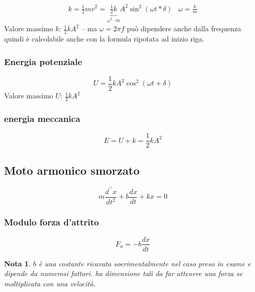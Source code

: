 \documentclass{book}
\newtheorem{nota}{Nota}[section]
\begin{document}
\begin{equation}
  \label{eq:encin}
  \begin{matrix}
    k=\frac{1}{2}mv^2=\underbrace{\frac{1}{2}k}_{\omega^2\cdot m}A^2\sin^2(\omega t*\delta) & \omega=\frac{k}{m}
  \end{matrix}
\end{equation}
Valore massimo $k$: $\frac{1}{2}kA^2$ -- ma $\omega=2\pi f$ può dipendere anche dalla frequenza quindi è calcolabile anche con la formula ripotata ad inizio riga.
\begin{multicols}{2}
  \subsubsection{Energia potenziale}
  \label{sec:enpotmotoarm}
  \begin{equation*}
    U=\frac{1}{2}kA^2\cos^2(\omega t +\delta)
  \end{equation*}
  Valore massimo $U$: $\frac{1}{2}kA^2$
  
  \subsubsection{energia meccanica}
  \label{sec:enmecmotoarm}
  \begin{equation*}
    E=U+k=\frac{1}{2}kA^2
  \end{equation*}
\end{multicols}

\subsection{Moto armonico smorzato}
\label{sec:motarmsmorz}

\begin{multicols}{2}
  \begin{equation}
    \label{eq:motarmsmorz}
    m\frac{d^{\prime\prime}x}{dt^2}+b\frac{dx}{dt}+kx=0
  \end{equation}
  
  \subsubsection{Modulo forza d'attrito}
  \label{sec:modforzattr}
  \begin{equation}
    \label{eq:modforzattr}
    F_a=-b\frac{dx}{dt}
  \end{equation}
\end{multicols}
\begin{nota}
  $b$ è una costante ricavata soerimentalmente nel caso preso in esame e dipende da numerosi fattori. ha dimensione tali da far attenere una forza se moltiplicata con una velocità.
\end{nota}
\end{document}
